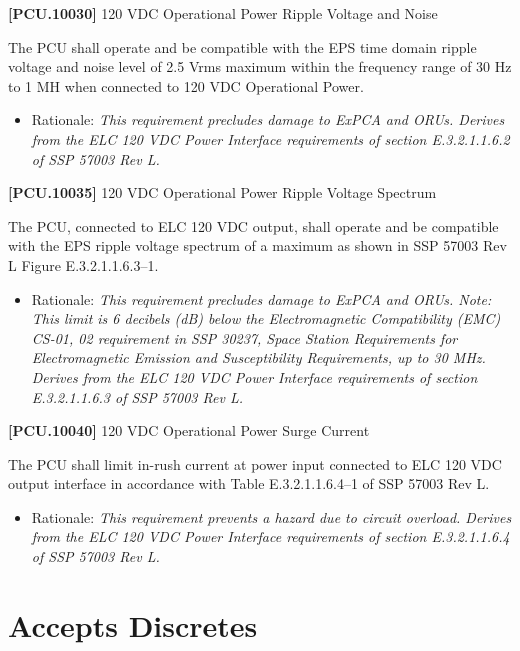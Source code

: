 \textbf{[PCU.10030]} 120 \gls{VDC} Operational Power Ripple Voltage and Noise

The \gls{PCU} shall operate and be compatible with the EPS time domain ripple voltage and noise level of 2.5 Vrms maximum within the frequency range of 30 Hz to 1 MH when connected to 120 \gls{VDC} Operational Power.

\begin{itemize}
\item{} Rationale: \emph{This requirement precludes damage to ExPCA and ORUs. Derives from the ELC 120 VDC Power Interface requirements of section E.3.2.1.1.6.2 of SSP 57003 Rev L.}

\end{itemize}

\textbf{[PCU.10035]} 120 \gls{VDC} Operational Power Ripple Voltage Spectrum

The \gls{PCU}, connected to \gls{ELC} 120 \gls{VDC} output, shall operate and be compatible with the EPS ripple voltage spectrum of a maximum as shown in SSP 57003 Rev L Figure E.3.2.1.1.6.3--1.

\begin{itemize}
\item{} Rationale: \emph{This requirement precludes damage to ExPCA and ORUs. Note: This limit is 6 decibels (dB) below the Electromagnetic Compatibility (EMC) CS-01, 02 requirement in SSP 30237, Space Station Requirements for Electromagnetic Emission and Susceptibility Requirements, up to 30 MHz. Derives from the ELC 120 VDC Power Interface requirements of section E.3.2.1.1.6.3 of SSP 57003 Rev L.}

\end{itemize}

\textbf{[PCU.10040]} 120 \gls{VDC} Operational Power Surge Current

The \gls{PCU} shall limit in-rush current at power input connected to \gls{ELC} 120 \gls{VDC} output interface in accordance with Table E.3.2.1.1.6.4--1 of SSP 57003 Rev L.

\begin{itemize}
\item{} Rationale: \emph{This requirement prevents a hazard due to circuit overload. Derives from the ELC 120 VDC Power Interface requirements of section E.3.2.1.1.6.4 of SSP 57003 Rev L.}

\end{itemize}

\section{Accepts Discretes}
\label{acceptsdiscretes}

